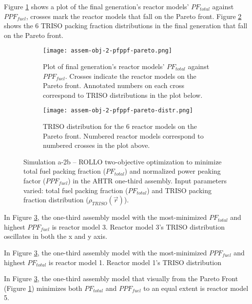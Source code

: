 Figure \ref{fig:assem-obj-2-pfppf-pareto} shows a plot of the final generation's reactor 
models' $PF_{total}$ against $PPF_{fuel}$, crosses mark the reactor models that fall on 
the Pareto front.
Figure \ref{fig:assem-obj-2-pfppf-pareto-distr} shows the 6 TRISO packing fraction 
distributions in the final generation that fall on the Pareto front. 
\begin{figure}[htbp!]
    \centering
    \begin{subfigure}{\textwidth}
        \texttt{[image: assem-obj-2-pfppf-pareto.png]}
        \caption{Plot of final generation's reactor models' $PF_{total}$ against 
        $PPF_{fuel}$. 
        Crosses indicate the reactor models on the Pareto front. Annotated numbers 
        on each cross correspond to TRISO distributions in the plot below.}
        \label{fig:assem-obj-2-pfppf-pareto} 
    \end{subfigure}
    \begin{subfigure}{\textwidth}
        \texttt{[image: assem-obj-2-pfppf-pareto-distr.png]}
        \caption{TRISO distribution for the 6 reactor models on the Pareto front.
        Numbered reactor models correspond to numbered crosses in the plot above. }
        \label{fig:assem-obj-2-pfppf-pareto-distr} 
    \end{subfigure}
    \caption{Simulation a-2b -- ROLLO two-objective optimization to minimize total fuel 
    packing fraction ($PF_{total}$) and normalized power peaking factor ($PPF_{fuel}$) 
    in the \gls{AHTR} one-third assembly. 
    Input parameters varied: total fuel packing fraction ($PF_{total}$) and TRISO 
    packing fraction distribution ($\rho_{TRISO}(\vec{r})$).}
    \label{fig:assem-obj-2-pfppf}
\end{figure}

In Figure \ref{fig:assem-obj-2-pfppf}, the one-third assembly model with 
the most-minimized $PF_{total}$ and highest $PPF_{fuel}$ is reactor model 3. 
Reactor model 3's TRISO distribution oscillates in both the x and y axis. 

In Figure \ref{fig:assem-obj-2-pfppf}, the one-third assembly model with 
the most-minimized $PPF_{fuel}$ and highest $PF_{total}$ is reactor model 1.
Reactor model 1's TRISO distribution 

In Figure \ref{fig:assem-obj-2-pfppf}, the one-third assembly model that 
visually from the Pareto Front (Figure \ref{fig:assem-obj-2-pfppf-pareto}) minimizes 
both $PF_{total}$ and $PPF_{fuel}$ to an equal extent is reactor model 5. 

